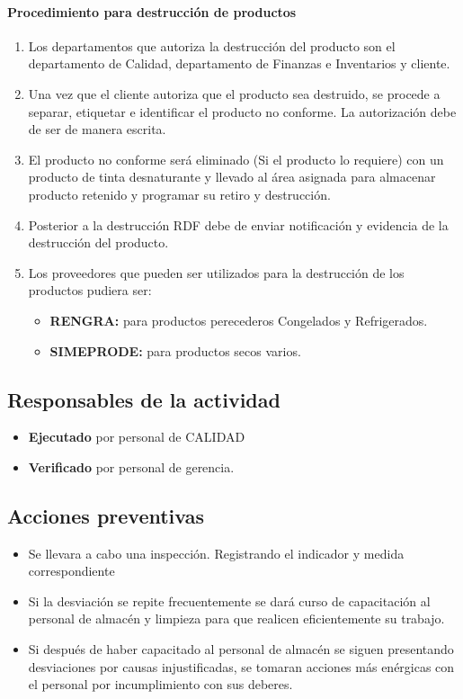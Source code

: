 \paragraph{Procedimiento para destrucción de productos}

\begin{enumerate}
	\item Los departamentos que autoriza la destrucción del producto son el departamento de Calidad, departamento de Finanzas e Inventarios y cliente.
	\item Una vez que el cliente autoriza que el producto sea destruido, se procede a separar, etiquetar e identificar el producto no conforme. La autorización debe de ser de manera escrita.
	\item El producto no conforme será eliminado (Si el producto lo requiere) con un producto de tinta desnaturante y llevado al área asignada para almacenar producto retenido y programar su retiro y destrucción.
	\item Posterior a la destrucción RDF debe de enviar notificación y evidencia de la destrucción del producto.
	\item Los proveedores que pueden ser utilizados para la destrucción de los productos pudiera ser:
	\begin{itemize}
		\item \textbf{RENGRA:} para productos perecederos Congelados y Refrigerados.
		\item \textbf{SIMEPRODE:} para productos secos varios.
	\end{itemize}
\end{enumerate}


\subsection{Responsables de la actividad}

\begin{itemize}
	\item \textbf{Ejecutado} por personal de CALIDAD
	\item \textbf{Verificado} por personal de gerencia.
\end{itemize}

\subsection{Acciones preventivas}

\begin{itemize}
	\item Se llevara a cabo una inspección. Registrando el indicador y medida correspondiente
	\item Si la desviación se repite frecuentemente se dará curso de capacitación al personal de almacén y limpieza para que realicen eficientemente su trabajo.
	\item Si después de haber capacitado al personal de almacén se siguen presentando desviaciones por causas injustificadas, se tomaran acciones más enérgicas con el personal por incumplimiento con sus deberes.
\end{itemize}

